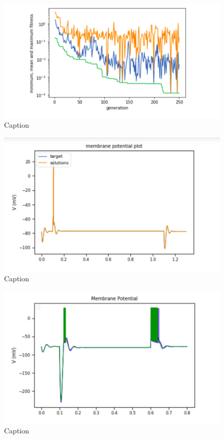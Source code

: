 \begin{figure}
    \centering
    \includegraphics{figures/simulated_data_stats.png}
    \caption{Caption}
    \label{fig:my_label}
\end{figure}

\begin{figure}
    \centering
    \includegraphics{figures/simulated_data_supra_threshold.png}
    \caption{Caption}
    \label{fig:my_label}
\end{figure}
\begin{figure}
    \centering
    \includegraphics{figures/simulated_data_sub_threshold.png}
    \caption{Caption}
    \label{fig:my_label}
\end{figure}

